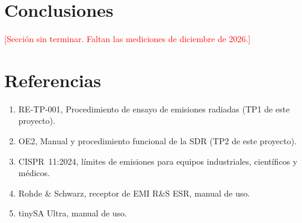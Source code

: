 \documentclass[11pt,a4paper]{article}
\newcommand{\pendiente}[1]{\textcolor{red}{[#1]}}
\begin{document}
\section{Conclusiones}

\pendiente{Sección sin terminar. Faltan las mediciones de diciembre de 2026.}

\section{Referencias}

\begin{enumerate}
  \item RE-TP-001, Procedimiento de ensayo de emisiones radiadas (TP1 de este proyecto).
  \item OE2, Manual y procedimiento funcional de la SDR (TP2 de este proyecto).
  \item CISPR~11:2024, límites de emisiones para equipos industriales, científicos y médicos.
  \item Rohde \& Schwarz, receptor de EMI R\&S ESR, manual de uso.
  \item tinySA Ultra, manual de uso.
\end{enumerate}
\end{document}
